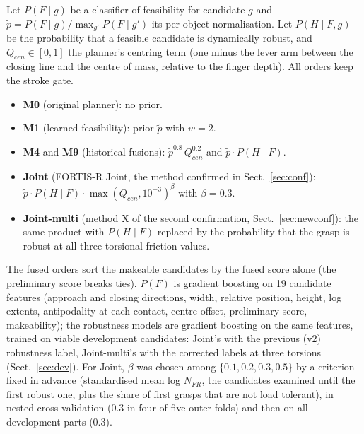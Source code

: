 \documentclass[pdflatex,sn-mathphys-num,iicol]{sn-jnl}
\begin{document}
Let $P(F\mid g)$ be a classifier of feasibility for candidate $g$ and $\tilde p = P(F\mid g)/\max_{g'} P(F\mid g')$ its per-object normalisation. Let $P(H\mid F, g)$ be the probability that a feasible candidate is dynamically robust, and $Q_{cen}\in[0,1]$ the planner's centring term (one minus the lever arm between the closing line and the centre of mass, relative to the finger depth). All orders keep the stroke gate.
\begin{itemize}
\item \textbf{M0} (original planner): no prior.
\item \textbf{M1} (learned feasibility): prior $\tilde p$ with $w=2$.
\item \textbf{M4} and \textbf{M9} (historical fusions): $\tilde p^{0.8}\,Q_{cen}^{0.2}$ and $\tilde p\cdot P(H\mid F)$.
\item \textbf{Joint} (FORTIS-R Joint, the method confirmed in Sect.~\ref{sec:conf}): $\tilde p\cdot P(H\mid F)\cdot \max(Q_{cen},10^{-3})^{\beta}$ with $\beta=0.3$.
\item \textbf{Joint-multi} (method X of the second confirmation, Sect.~\ref{sec:newconf}): the same product with $P(H\mid F)$ replaced by the probability that the grasp is robust at all three torsional-friction values.
\end{itemize}
The fused orders sort the makeable candidates by the fused score alone (the preliminary score breaks ties).
$P(F)$ is gradient boosting \cite{pedregosa2011sklearn} on 19 candidate features (approach and closing directions, width, relative position, height, log extents, antipodality at each contact, centre offset, preliminary score, makeability); the robustness models are gradient boosting on the same features, trained on viable development candidates: Joint's with the previous (v2) robustness label, Joint-multi's with the corrected labels at three torsions (Sect.~\ref{sec:dev}). For Joint, $\beta$ was chosen among $\{0.1,0.2,0.3,0.5\}$ by a criterion fixed in advance (standardised mean log $N_{FR}$, the candidates examined until the first robust one, plus the share of first grasps that are not load tolerant), in nested cross-validation (0.3 in four of five outer folds) and then on all development parts (0.3).
\end{document}
